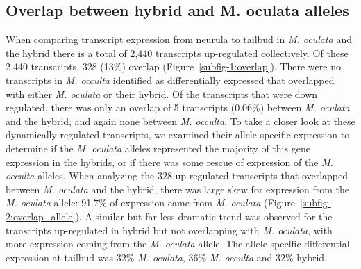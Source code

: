 \subsection{Overlap between hybrid and M. oculata alleles}
When comparing transcript expression from neurula to tailbud in \textit{M. oculata} and the hybrid there is a total of 2,440 transcripts up-regulated collectively. Of these 2,440 transcripts, 328 (13\%) overlap (Figure~\ref{subfig-1:overlap}). There were no transcripts in \textit{M. occulta} identified as differentially expressed that overlapped with either \textit{M. oculata} or their hybrid. Of the transcripts that were down regulated, there was only an overlap of 5 transcripts (0.06\%) between \textit{M. oculata} and the hybrid, and again none between \textit{M. occulta}. To take a closer look at these dynamically regulated transcripts, we examined their allele specific expression to determine if the \textit{M. oculata} alleles represented the majority of this gene expression in the hybrids, or if there was some rescue of expression of the \textit{M. occulta} alleles. When analyzing the 328 up-regulated transcripts that overlapped between \textit{M. oculata} and the hybrid, there was large skew for expression from the \textit{M. oculata} allele: 91.7\% of expression came from \textit{M. oculata} (Figure~\ref{subfig-2:overlap_allele}). A similar but far less dramatic trend was observed for the transcripts up-regulated in hybrid but not overlapping with \textit{M. oculata}, with more expression coming from the \textit{M. oculata} allele. The allele specific differential expression at tailbud was 32\% \textit{M. oculata}, 36\% \textit{M. occulta} and 32\% hybrid.


